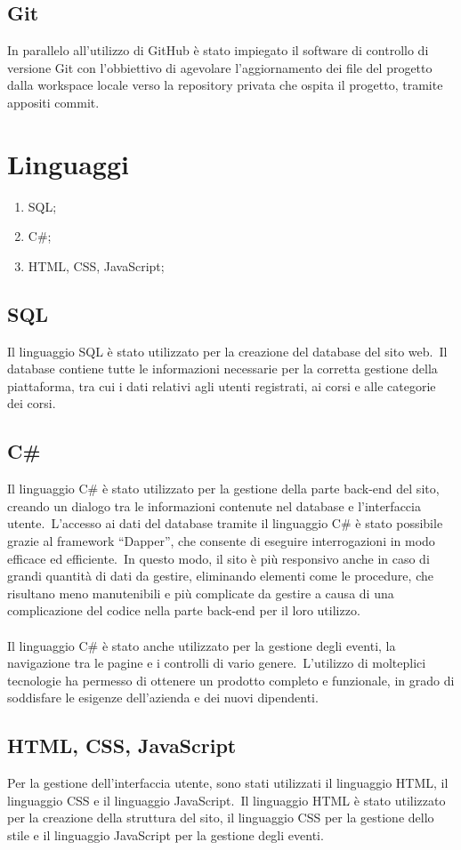 \subsection{Git}\label{sec:cap_sec_subsec}
In parallelo all'utilizzo di GitHub è stato impiegato il software di controllo di versione Git 
con l'obbiettivo di agevolare l'aggiornamento dei file del progetto dalla workspace locale verso 
la repository privata che ospita il progetto, tramite appositi commit.
\section{Linguaggi}\label{sec:cap_sec_subsec}
\begin{enumerate}
    \item SQL;
    \item C\#;
    \item HTML, CSS, JavaScript;
\end{enumerate}
%
\subsection{SQL}\label{sec:cap_sec_subsec}
Il linguaggio SQL è stato utilizzato per 
la creazione del database del sito web.\ Il database contiene tutte le informazioni 
necessarie per la corretta gestione della piattaforma, tra cui i dati relativi agli utenti 
registrati, ai corsi e alle categorie dei corsi.
%
\subsection{C\#}\label{sec:cap_sec_subsec}
Il linguaggio C\# è stato utilizzato per la gestione della parte back-end del sito, 
creando un dialogo tra le informazioni contenute nel database e l'interfaccia utente.\
L'accesso ai dati del database tramite il linguaggio C\# è stato possibile grazie 
al framework ``Dapper'', che consente di eseguire interrogazioni in modo efficace ed 
efficiente.\ In questo modo, il sito è più responsivo anche in caso di grandi quantità di 
dati da gestire, eliminando elementi come le procedure, che risultano meno 
manutenibili e più complicate da gestire a causa di una complicazione del codice nella 
parte back-end per il loro utilizzo. 
\\ \\
Il linguaggio C\# è stato anche utilizzato per la 
gestione degli eventi, la navigazione tra le pagine e i controlli di vario genere.\
L'utilizzo di molteplici 
tecnologie ha permesso di ottenere un prodotto completo e funzionale, in grado di 
soddisfare le esigenze dell'azienda e dei nuovi dipendenti.
%
\subsection{HTML, CSS, JavaScript}\label{sec:cap_sec_subsec}
Per la gestione dell'interfaccia utente, sono stati utilizzati il linguaggio HTML, il 
linguaggio CSS e il linguaggio JavaScript.\ Il linguaggio HTML è stato utilizzato per la 
creazione della struttura del sito, il linguaggio CSS per la gestione dello stile e il 
linguaggio JavaScript per la gestione degli eventi.